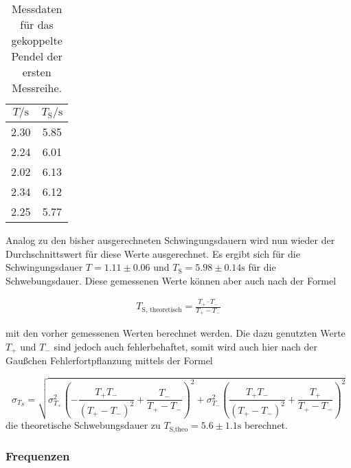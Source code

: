            \begin{table}[ht]
                \centering
                \caption{Messdaten für das gekoppelte Pendel der ersten Messreihe.}
                \label{tab:gek1}
                \begin{tabular}{c c}
                 \toprule
                 $T / \si{\s}$ & $T_{\text{S}} / \si{\s}$\\
                 \midrule
                 2.30   & 5.85 \\
                 2.24   & 6.01 \\
                 2.02   & 6.13 \\
                 2.34   & 6.12 \\
                 2.25   & 5.77 \\
                 \bottomrule
                \end{tabular}
            \end{table}

            \noindent Analog zu den bisher ausgerechneten Schwingungsdauern wird nun wieder der Durchschnittswert für diese Werte ausgerechnet.
            Es ergibt sich für die Schwingungsdauer $T = 1.11 \pm 0.06 $ und $T_{\text{S}} = 5.98 \pm 0.14 \si{\second}$ für die Schwebungsdauer.
            Diese gemessenen Werte können aber auch nach der Formel 

            \begin{align*}
                T_\text{S, theoretisch} = \frac{T_{+} \cdot T_{-}}{T_{+} - T_{-}}
            \end{align*}

            \noindent mit den vorher gemessenen Werten berechnet werden. Die dazu genutzten Werte $T_+$ und $T_-$ sind jedoch auch fehlerbehaftet, 
            somit wird auch hier nach der Gaußchen Fehlerfortpflanzung mittels der Formel 

            \begin{equation*}
                \sigma_{T_S} = \sqrt{\sigma_{T_{+}}^{2} \left(- \frac{T_{+} T_{-}}{\left(T_{+} - T_{-}\right)^{2}} + \frac{T_{-}}{T_{+} - T_{-}}\right)^{2} + \sigma_{T_{-}}^{2} \left(\frac{T_{+} T_{-}}{\left(T_{+} - T_{-}\right)^{2}} + \frac{T_{+}}{T_{+} - T_{-}}\right)^{2}}
            \end{equation*}
            die theoretische Schwebungsdauer zu $T_{\text{S,theo}} = 5.6 \pm 1.1 \si{\second}$ berechnet.
            \noindent 

        \subsubsection{Frequenzen}

